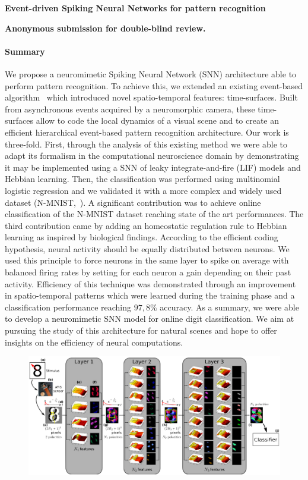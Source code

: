 \documentclass[12pt]{article}
\newcommand{\citet}[1]{\textcite{#1}}
\newcommand{\AuthorAG}{Antoine Grimaldi}
\newcommand{\AuthorLP}{Laurent Perrinet}
\newcommand{\AuthorVB}{Victor Boutin}
\newcommand{\AddressLP}{Institut de Neurosciences de la Timone (UMR 7289); Aix Marseille Univ, CNRS; Marseille, France}%
\newcommand{\AuthorSI}{Sio-Hoi Ieng}
\newcommand{\AuthorRB}{Ryad Benosman}%
\newcommand{\AddressRB}{Sorbonne Université, INSERM, CNRS, Institut de la Vision, France;}%
\newcommand{\Summary}{ %

We propose a neuromimetic Spiking Neural Network (SNN) architecture able to perform pattern recognition. %
To achieve this, we extended an existing event-based algorithm~\citet{Lagorce17} which introduced novel spatio-temporal features: time-surfaces. Built from asynchronous events acquired by a neuromorphic camera, these time-surfaces allow to code the local dynamics of a visual scene and to create an efficient hierarchical event-based pattern recognition architecture.
Our work is three-fold. First, through the analysis of this existing method we were able to adapt its formalism in the computational neuroscience domain by demonstrating it may be implemented using a SNN of leaky integrate-and-fire (LIF) models and Hebbian learning.
Then, the classification was performed using multinomial logistic regression %
and we validated it with a more complex and widely used dataset (N-MNIST,~\citet{Orchard15}).
A significant contribution was to achieve online classification of the N-MNIST dataset reaching state of the art performances. %
The third contribution came by adding an homeostatic regulation rule to Hebbian learning as inspired by biological findings. According to the efficient coding hypothesis, neural activity should be equally distributed between neurons. We used this principle to force neurons in the same layer to spike on average with balanced firing rates by setting for each neuron a gain depending on their past activity. Efficiency of this technique was demonstrated through an improvement in spatio-temporal patterns which were learned during the training phase and a classification performance reaching $97,8\%$ accuracy. As a summary, %
we were able to develop a neuromimetic SNN model for online digit classification. We aim at pursuing the study of this architecture for natural scenes and hope to offer insights on the efficiency of neural computations.
}
\begin{document}
{\Large\bf
Event-driven Spiking Neural Networks %
for
pattern recognition
}

{\bf
Anonymous submission for double-blind review.
}
%

\paragraph*{Summary}
\Summary
%
\begin{figure}
\vspace{-15pt}
\includegraphics[width=1.04\linewidth]{../notebooks/fig/hots.png}
\vspace{-45pt}
\caption*
{\label{fig:fig1}
}
\end{figure}
\end{document}
